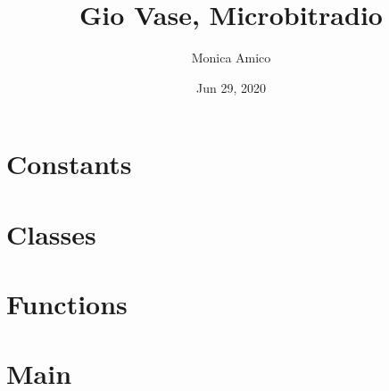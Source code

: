 \documentclass[letterpaper,10pt,english]{sphinxmanual}
\title{Gio Vase, Microbit\sphinxhyphen{}radio}
\date{Jun 29, 2020}
\author{Monica Amico}
\begin{document}
\pagestyle{empty}
\sphinxmaketitle
\pagestyle{plain}
\sphinxtableofcontents
\pagestyle{normal}
\label{\detokenize{index::doc}}



\chapter{Constants}
\label{\detokenize{index:constants}}

\chapter{Classes}
\label{\detokenize{index:classes}}

\chapter{Functions}
\label{\detokenize{index:functions}}

\chapter{Main}
\label{\detokenize{index:main}}


\renewcommand{\indexname}{Index}
\printindex
\end{document}
